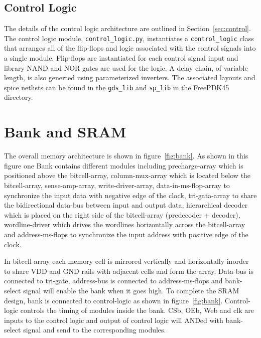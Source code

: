 \subsection{Control Logic}

The details of the control logic architecture are outlined in
Section~\ref{sec:control}.  The control logic module,
\verb|control_logic.py|, instantiates a \verb|control_logic| class that arranges
all of the flip-flops and logic associated with the control signals
into a single module. Flip-flops are instantiated for each control
signal input and library NAND and NOR gates are used for the logic.  A
delay chain, of variable length, is also generted using parameterized
inverters.  The associated layouts and spice netlists can be found in
the \verb|gds_lib| and \verb|sp_lib| in the FreePDK45 directory.

\section{Bank and SRAM}
\label{sec:bank}

The overall memory architecture is shown in figure~\ref{fig:bank}.
As shown in this figure one Bank contains different modules including 
precharge-array which is positioned above the bitcell-array, 
column-mux-array which is located below the bitcell-array, 
sense-amp-array, write-driver-array, data-in-ms-flop-array 
to synchronize the input data with negative edge of the clock, 
tri-gata-array to share the bidirectional data-bus between input 
and output data, hierarchical decoder which is placed on the right side 
of the bitcell-array (predecoder + decoder), wordline-driver which drives 
the wordlines horizontally across the bitcell-array and address-ms-flops 
to synchronize the input address with positive edge of the clock. 

In bitcell-array each memory cell is mirrored vertically and horizontally inorder to share VDD and GND rails with adjacent cells and form the array. 
Data-bus is connected to tri-gate, address-bus is connected to address-ms-flops and bank-select 
signal will enable the bank when it goes high. To complete the SRAM design, bank is connected to control-logic as shown in figure~\ref{fig:bank}. 
Control-logic controls the timing 
of modules inside the bank. CSb, OEb, Web and clk are inputs to the control logic and output of 
control logic will ANDed with bank-select signal and send to the corresponding modules.


